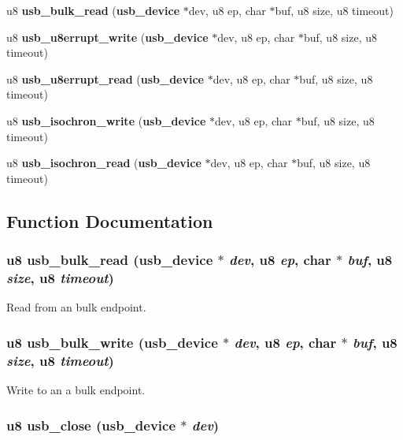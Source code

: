 \begin{CompactItemize}
u8 {\bf usb\_\-bulk\_\-read} ({\bf usb\_\-device} $\ast$dev, u8 ep, char $\ast$buf, u8 size, u8 timeout)
\item 
u8 {\bf usb\_\-u8errupt\_\-write} ({\bf usb\_\-device} $\ast$dev, u8 ep, char $\ast$buf, u8 size, u8 timeout)
\item 
u8 {\bf usb\_\-u8errupt\_\-read} ({\bf usb\_\-device} $\ast$dev, u8 ep, char $\ast$buf, u8 size, u8 timeout)
\item 
u8 {\bf usb\_\-isochron\_\-write} ({\bf usb\_\-device} $\ast$dev, u8 ep, char $\ast$buf, u8 size, u8 timeout)
\item 
u8 {\bf usb\_\-isochron\_\-read} ({\bf usb\_\-device} $\ast$dev, u8 ep, char $\ast$buf, u8 size, u8 timeout)
\end{CompactItemize}


\subsection{Function Documentation}
\subsubsection{\setlength{\rightskip}{0pt plus 5cm}u8 usb\_\-bulk\_\-read ({\bf usb\_\-device} $\ast$ {\em dev}, u8 {\em ep}, char $\ast$ {\em buf}, u8 {\em size}, u8 {\em timeout})}\label{usb_8h_09618efcb98dc1cf22908bc76973ac5b}


Read from an bulk endpoint. 
\subsubsection{\setlength{\rightskip}{0pt plus 5cm}u8 usb\_\-bulk\_\-write ({\bf usb\_\-device} $\ast$ {\em dev}, u8 {\em ep}, char $\ast$ {\em buf}, u8 {\em size}, u8 {\em timeout})}\label{usb_8h_780bd3c2aeb11aa07d94e7fd2814091e}


Write to an a bulk endpoint. 
\subsubsection{\setlength{\rightskip}{0pt plus 5cm}u8 usb\_\-close ({\bf usb\_\-device} $\ast$ {\em dev})}\label{usb_8h_a016743f793d7fbe430b91a6ac19bbca}



